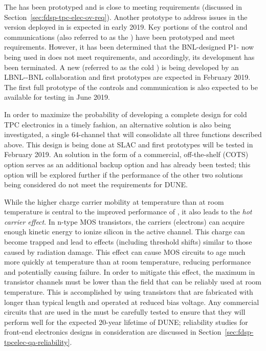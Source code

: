 The   has been prototyped and is close to meeting requirements (discussed in Section~\ref{sec:fdsp-tpc-elec-ov-req}). Another prototype to address issues in the version deployed in  is expected in early 2019. Key portions of the control and communications  (also referred to as the  ) have been prototyped and meet requirements.  However, it has been determined that the BNL-designed P1-  now being used in  does not meet requirements, and accordingly, its development has been terminated.  A new   (referred to as the cold  ) is being developed by an LBNL-\fnal-BNL collaboration and first prototypes are expected in February 2019.  The first full prototype of the controls and communication  is also expected to be available for testing in June 2019.

In order to maximize the probability of developing a complete design for cold TPC  electronics in a timely fashion, an alternative solution is also being investigated, a single \num{64}-channel  that will consolidate all three functions described above.  This design is being done at SLAC and first prototypes will be tested in February 2019.  An  solution in the form of a commercial, off-the-shelf (COTS) option serves as an additional backup option and has already been tested; this option will be explored further if the performance of the other two  solutions being considered do not meet the requirements for DUNE.

While the higher charge carrier mobility at \lar temperature than at room temperature is central to the improved performance of , it also leads to the \textit{hot carrier effect}.  In n-type MOS transistors, the carriers (electrons) can acquire enough kinetic energy to ionize silicon in the active channel.  This charge can become trapped and lead to effects (including threshold shifts) similar to those caused by radiation damage.  This effect can cause MOS circuits to age much more quickly at \lar temperature than at room temperature, reducing performance and potentially causing failure.  In order to mitigate this effect, the maximum \efield in transistor channels must be lower than the field that can be reliably used at room temperature.  This is accomplished by using transistors that are fabricated with longer than typical length and operated at reduced bias voltage.  Any commercial circuits that are used in the \lar must be carefully tested to ensure that they will perform well for the expected \num{20}-year lifetime of DUNE; reliability studies for front-end electronics designs in consideration are discussed in Section~\ref{sec:fdsp-tpcelec-qa-reliability}.

